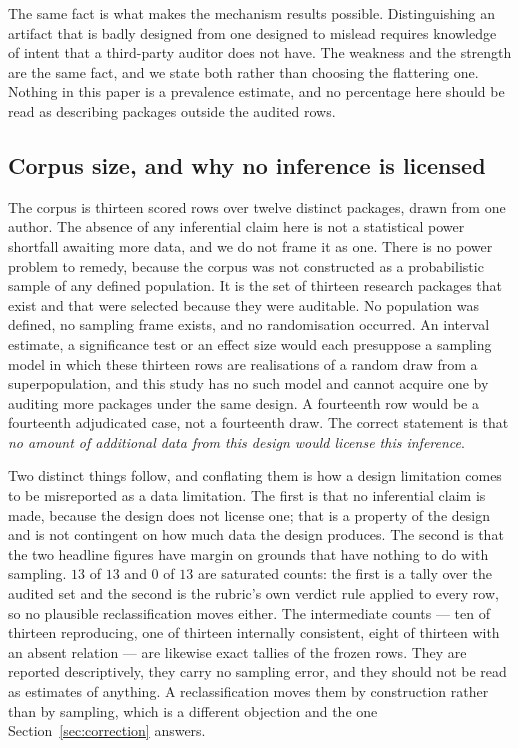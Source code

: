 \documentclass[sigconf,review]{acmart}
\begin{document}
The same fact is what makes the mechanism results possible. Distinguishing an
artifact that is badly designed from one designed to mislead requires
knowledge of intent that a third-party auditor does not have. The weakness and
the strength are the same fact, and we state both rather than choosing the
flattering one. Nothing in this paper is a prevalence estimate, and no
percentage here should be read as describing packages outside the audited
rows.

\subsection{Corpus size, and why no inference is licensed}
\label{sec:threat-n}

The corpus is thirteen scored rows over twelve distinct packages, drawn from
one author. The absence of any inferential claim here is not a statistical
power shortfall awaiting more data, and we do not frame it as one. There is no
power problem to remedy, because the corpus was not constructed as a
probabilistic sample of any defined population. It is the set of thirteen
research packages that exist and that were selected because they were
auditable. No population was defined, no sampling frame exists, and no
randomisation occurred. An interval estimate, a significance test or an effect
size would each presuppose a sampling model in which these thirteen rows are
realisations of a random draw from a superpopulation, and this study has no
such model and cannot acquire one by auditing more packages under the same
design. A fourteenth row would be a fourteenth adjudicated case, not a
fourteenth draw. The correct statement is that \emph{no amount of additional
data from this design would license this inference}.

Two distinct things follow, and conflating them is how a design limitation
comes to be misreported as a data limitation. The first is that no
inferential claim is made, because the design does not license one; that is a
property of the design and is not contingent on how much data the design
produces. The second is that the two headline figures have margin on grounds
that have nothing to do with sampling. $13$ of $13$ and $0$ of $13$ are
saturated counts: the first is a tally over the audited set and the second is
the rubric's own verdict rule applied to every row, so no plausible
reclassification moves either. The intermediate counts --- ten of thirteen
reproducing, one of thirteen internally consistent, eight of thirteen with an
absent relation --- are likewise exact tallies of the frozen rows. They are
reported descriptively, they carry no sampling error, and they should not be
read as estimates of anything. A reclassification moves them by construction
rather than by sampling, which is a different objection and the one
Section~\ref{sec:correction} answers.
\end{document}
